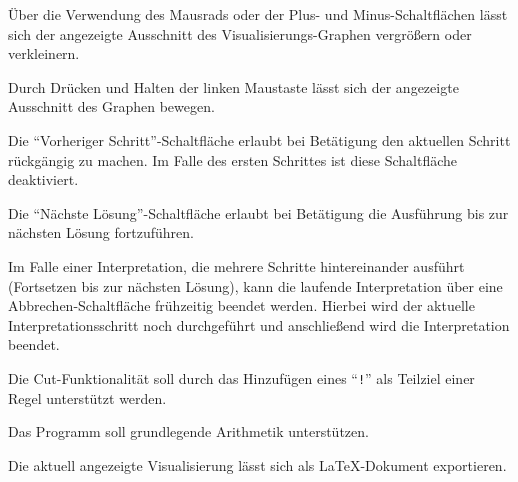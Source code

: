 \documentclass[parskip=full,11pt,twoside]{scrartcl}
\begin{document}

Über die Verwendung des Mausrads oder der Plus- und Minus-Schaltflächen lässt sich der angezeigte Ausschnitt des Visualisierungs-Graphen vergrößern oder verkleinern.


Durch Drücken und Halten der linken Maustaste lässt sich der angezeigte Ausschnitt des Graphen bewegen.


Die \enquote{Vorheriger Schritt}-Schaltfläche erlaubt bei Betätigung den aktuellen Schritt rückgängig zu machen. Im Falle des ersten Schrittes ist diese Schaltfläche deaktiviert.


Die \enquote{Nächste Lösung}-Schaltfläche erlaubt bei Betätigung die Ausführung bis zur nächsten Lösung fortzuführen.


Im Falle einer Interpretation, die mehrere Schritte hintereinander ausführt (Fortsetzen bis zur nächsten Lösung), kann die laufende Interpretation über eine Abbrechen-Schaltfläche frühzeitig beendet werden. Hierbei wird der aktuelle Interpretationsschritt noch durchgeführt und anschließend wird die Interpretation beendet.


Die Cut-Funktionalität soll durch das Hinzufügen eines \enquote{\texttt{!}} als Teilziel einer Regel unterstützt werden.


Das Programm soll grundlegende Arithmetik unterstützen.


Die aktuell angezeigte Visualisierung lässt sich als LaTeX-Dokument exportieren.
\end{document}

